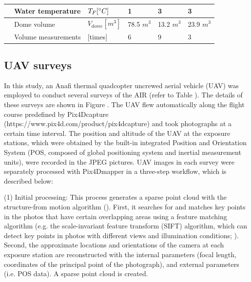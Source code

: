 \documentclass[utf8]{frontiersSCNS} %
\begin{document}
\begin{table}
\begin{tabular}{@{}|llllll|@{}}
		\multicolumn{1}{|l|}{} & Water temperature           & $T_{F} [\degree C]$       & 1             & 3             & 3             \\\midrule
		\multicolumn{1}{|l|}{\multirow{2}{*}{\rotatebox[origin=c]{90}{UAV}}}
		                       & Dome volume                 & $V_{dome}[m^{3}]$         & 78.5 $m^{3}$  & 13.2 $m^{3}$  & 23.9 $m^{3}$  \\
		\multicolumn{1}{|l|}{} & Volume measurements         & [times]                   & 6             & 9             & 3
    \\\bottomrule
	\end{tabular}
\end{table}

\subsection{UAV surveys}
In this study, an Anafi thermal quadcopter uncrewed aerial vehicle (UAV) was employed to conduct several surveys of the
AIR (refer to Table ).  The details of these surveys are shown in Figure . The UAV flew automatically along the flight
course predefined by Pix4Dcapture (https://www.pix4d.com/product/pix4dcapture) and took photographs at a certain time
interval. The position and altitude of the UAV at the exposure stations, which were obtained by the built-in integrated
Position and Orientation System (POS, composed of global positioning system and inertial measurement units), were
recorded in the JPEG pictures. UAV images in each survey were separately processed with Pix4Dmapper in a three-step
workflow, which is described below:

(1) Initial processing: This process generates a sparse point cloud with the structure-from motion algorithm
(\cite{Turner_2012}). First, it searches for and matches key points in the photos that have certain overlapping areas using a
feature matching algorithm (e.g. the scale-invariant feature transform (SIFT) algorithm, which can detect key points in
photos with different views and illumination conditions; \cite{Lowe_2004}). Second, the approximate locations and
orientations of the camera at each exposure station are reconstructed with the internal parameters (focal length,
coordinates of the principal point of the photograph), and external parameters (i.e. POS data). A sparse point cloud is
created.
\end{document}
